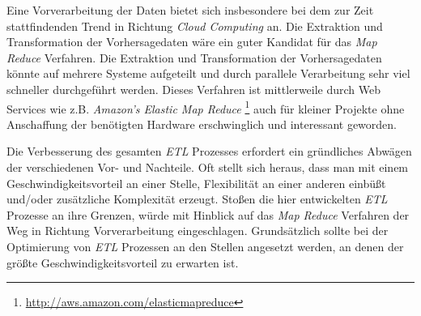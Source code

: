 Eine Vorverarbeitung der Daten bietet sich insbesondere bei dem zur
Zeit stattfindenden Trend in Richtung \textit{Cloud Computing} an. Die
Extraktion und Transformation der Vorhersagedaten wäre ein guter
Kandidat für das \textit{Map Reduce} Verfahren. Die Extraktion und
Transformation der Vorhersagedaten könnte auf mehrere Systeme
aufgeteilt und durch parallele Verarbeitung sehr viel schneller
durchgeführt werden.  Dieses Verfahren ist mittlerweile durch Web
Services wie z.B. \textit{Amazon's Elastic Map Reduce}
\footnote{\url{http://aws.amazon.com/elasticmapreduce}} auch für
kleiner Projekte ohne Anschaffung der benötigten Hardware
erschwinglich und interessant geworden.

Die Verbesserung des gesamten \textit{ETL} Prozesses erfordert ein
gründliches Abwägen der verschiedenen Vor- und Nachteile. Oft stellt
sich heraus, dass man mit einem Geschwindigkeitsvorteil an einer
Stelle, Flexibilität an einer anderen einbüßt und/oder zusätzliche
Komplexität erzeugt. Stoßen die hier entwickelten \textit{ETL}
Prozesse an ihre Grenzen, würde mit Hinblick auf das \textit{Map
  Reduce} Verfahren der Weg in Richtung Vorverarbeitung
eingeschlagen. Grundsätzlich sollte bei der Optimierung von
\textit{ETL} Prozessen an den Stellen angesetzt werden, an denen der
größte Geschwindigkeitsvorteil zu erwarten ist.

